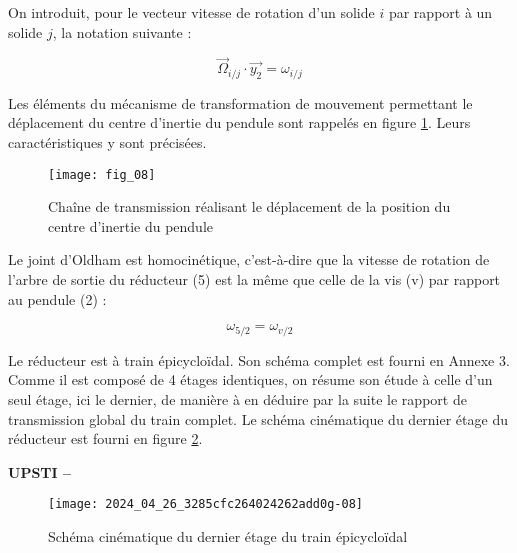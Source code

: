 On introduit, pour le vecteur vitesse de rotation d'un solide $i$ par rapport à un solide $j$, la notation suivante :

$$
\vec{\Omega}_{i / j} \cdot \overrightarrow{y_{2}}=\omega_{i / j}
$$

Les éléments du mécanisme de transformation de mouvement permettant le déplacement du centre d'inertie du pendule sont rappelés en figure \ref{ccmp2023_fig_08}. Leurs caractéristiques y sont précisées.

\begin{figure}[!h]
\centering
\texttt{[image: fig\_08]}
\caption{\label{ccmp2023_fig_08} Chaîne de transmission réalisant le déplacement de la position du centre d'inertie du pendule}
\end{figure}



Le joint d'Oldham est homocinétique, c'est-à-dire que la vitesse de rotation de l'arbre de sortie du réducteur (5) est la même que celle de la vis (v) par rapport au pendule (2) :

$$
\omega_{5 / 2}=\omega_{v / 2}
$$

Le réducteur est à train épicycloïdal. Son schéma complet est fourni en Annexe 3. Comme il est composé de 4 étages identiques, on résume son étude à celle d'un seul étage, ici le dernier, de manière à en déduire par la suite le rapport de transmission global du train complet. Le schéma cinématique du dernier étage du réducteur est fourni en figure \ref{ccmp2023_fig_09}.
\fi

\ifprof
\begin{corrige}
\textbf{UPSTI -- }

\end{corrige}
\else
\fi

\ifprof
\else

\begin{figure}[!h]
\centering
\texttt{[image: 2024\_04\_26\_3285cfc264024262add0g-08]}
\caption{\label{ccmp2023_fig_09} Schéma cinématique du dernier étage du train épicycloïdal}
\end{figure}
\fi

